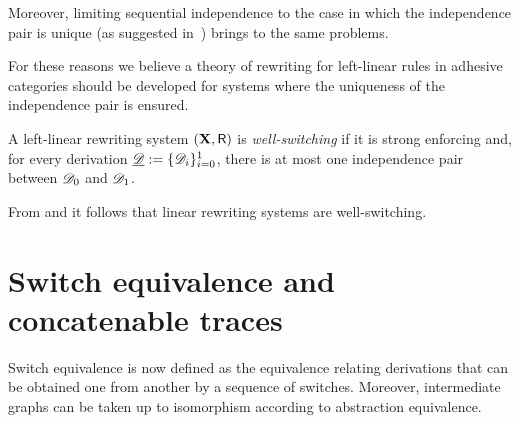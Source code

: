 Moreover, limiting sequential independence to the case in which the independence pair is unique (as suggested in~\cite{baldan2017domains}) brings to the same problems.

For these reasons we believe a theory of rewriting for
left-linear rules in adhesive categories should be developed for
systems where the uniqueness of the independence pair is ensured.

\begin{definition}
	A left-linear rewriting system $(\textbf {\textup{X}}, \mathsf{R})$ is \emph{well-switching} if it is strong enforcing and, for every derivation $\underline{\mathscr{D}}:=\{\mathscr{D}_{i}\}_{i=0}^1$, there is at most one independence pair between $\mathscr{D}_0$ and $\mathscr{D}_1$.
\end{definition}


\begin{remark}
	From  and  it follows that linear rewriting systems are well-switching.
\end{remark}




\section{Switch equivalence and concatenable traces}

Switch equivalence is now defined as the equivalence relating derivations that 
can be obtained one from another by a sequence of switches. Moreover, intermediate graphs can be taken up to isomorphism according to abstraction equivalence.

